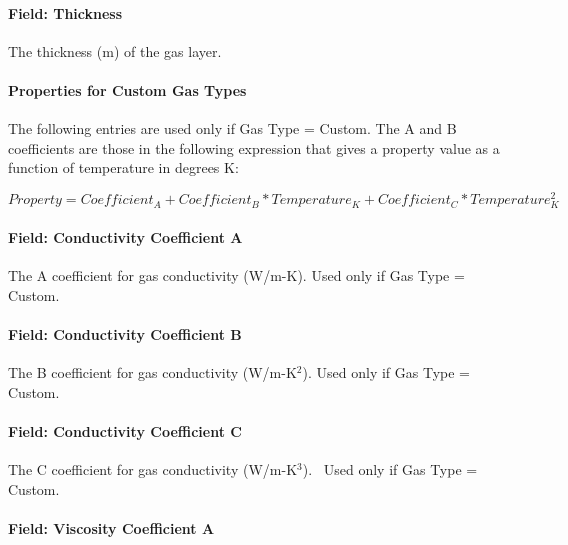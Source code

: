 \paragraph{Field: Thickness}\label{field-thickness-3}

The thickness (m) of the gas layer.

\paragraph{Properties for Custom Gas Types}\label{properties-for-custom-gas-types}

The following entries are used only if Gas Type = Custom. The A and B coefficients are those in the following expression that gives a property value as a function of temperature in degrees K:

\begin{equation}
Property = Coefficien{t_A} + Coefficien{t_B}*Temperatur{e_K} + Coefficien{t_C}*Temperature_K^2
\end{equation}

\paragraph{Field: Conductivity Coefficient A}\label{field-conductivity-coefficient-a}

The A coefficient for gas conductivity (W/m-K). Used only if Gas Type = Custom.

\paragraph{Field: Conductivity Coefficient B}\label{field-conductivity-coefficient-b}

The B coefficient for gas conductivity (W/m-K\(^{2}\)). Used only if Gas Type = Custom.

\paragraph{Field: Conductivity Coefficient C}\label{field-conductivity-coefficient-c}

The C coefficient for gas conductivity (W/m-K\(^{3}\)).~ Used only if Gas Type = Custom.

\paragraph{Field: Viscosity Coefficient A}\label{field-viscosity-coefficient-a}

